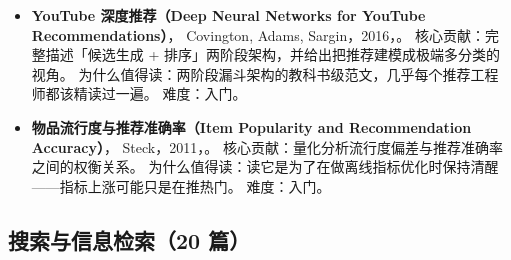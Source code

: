 \begin{itemize}
        难度：硬核——需要先理解语义 ID 与自回归解码。
  \item \textbf{YouTube 深度推荐（Deep Neural Networks for YouTube Recommendations）}，
        Covington, Adams, Sargin，2016，\cite{covington2016youtube}。
        核心贡献：完整描述「候选生成 + 排序」两阶段架构，并给出把推荐建模成极端多分类的视角。
        为什么值得读：两阶段漏斗架构的教科书级范文，几乎每个推荐工程师都该精读过一遍。
        难度：入门。
  \item \textbf{物品流行度与推荐准确率（Item Popularity and Recommendation Accuracy）}，
        Steck，2011，\cite{steck2011diversity}。
        核心贡献：量化分析流行度偏差与推荐准确率之间的权衡关系。
        为什么值得读：读它是为了在做离线指标优化时保持清醒——指标上涨可能只是在推热门。
        难度：入门。
\end{itemize}

\subsection{搜索与信息检索（20 篇）}

